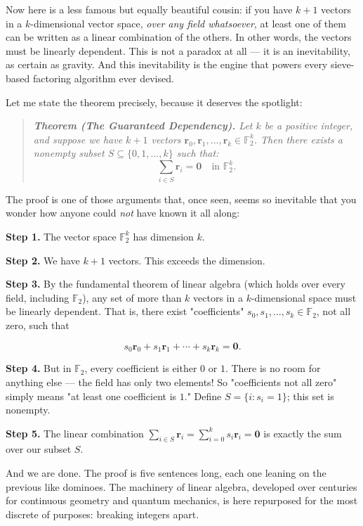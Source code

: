 Now here is a less famous but equally beautiful cousin: if you have $k + 1$ vectors in a $k$-dimensional vector space, \textit{over any field whatsoever}, at least one of them can be written as a linear combination of the others. In other words, the vectors must be linearly dependent. This is not a paradox at all --- it is an inevitability, as certain as gravity. And this inevitability is the engine that powers every sieve-based factoring algorithm ever devised.

Let me state the theorem precisely, because it deserves the spotlight:


\begin{quote}
\itshape
\textbf{Theorem (The Guaranteed Dependency).} \textit{Let $k$ be a positive integer, and suppose we have $k + 1$ vectors $\mathbf{r}_0, \mathbf{r}_1, \ldots, \mathbf{r}_k \in \mathbb{F}_2^k$. Then there exists a nonempty subset $S \subseteq \{0, 1, \ldots, k\}$ such that:} $$\sum_{i \in S} \mathbf{r}_i = \mathbf{0} \quad \text{in } \mathbb{F}_2^k.$$
\end{quote}


The proof is one of those arguments that, once seen, seems so inevitable that you wonder how anyone could \textit{not} have known it all along:

\textbf{Step 1.} The vector space $\mathbb{F}_2^k$ has dimension $k$.

\textbf{Step 2.} We have $k + 1$ vectors. This exceeds the dimension.

\textbf{Step 3.} By the fundamental theorem of linear algebra (which holds over every field, including $\mathbb{F}_2$), any set of more than $k$ vectors in a $k$-dimensional space must be linearly dependent. That is, there exist "coefficients" $s_0, s_1, \ldots, s_k \in \mathbb{F}_2$, not all zero, such that

\[s_0 \mathbf{r}_0 + s_1 \mathbf{r}_1 + \cdots + s_k \mathbf{r}_k = \mathbf{0}.\]

\textbf{Step 4.} But in $\mathbb{F}_2$, every coefficient is either $0$ or $1$. There is no room for anything else --- the field has only two elements! So "coefficients not all zero" simply means "at least one coefficient is $1$." Define $S = \{i : s_i = 1\}$; this set is nonempty.

\textbf{Step 5.} The linear combination $\sum_{i \in S} \mathbf{r}_i = \sum_{i=0}^k s_i \mathbf{r}_i = \mathbf{0}$ is exactly the sum over our subset $S$.

And we are done. The proof is five sentences long, each one leaning on the previous like dominoes. The machinery of linear algebra, developed over centuries for continuous geometry and quantum mechanics, is here repurposed for the most discrete of purposes: breaking integers apart.

